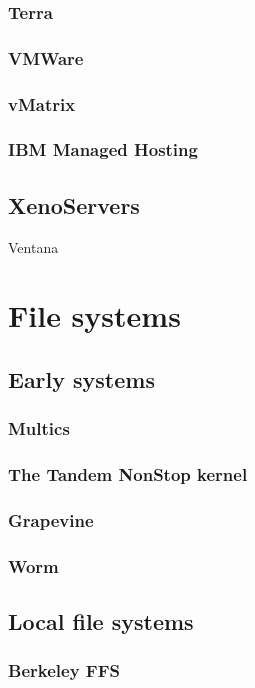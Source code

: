 \subsubsection{Terra}
\cite{garfinkel}
\subsubsection{VMWare}
\subsubsection{vMatrix}
\subsubsection{IBM Managed Hosting}

\subsection{XenoServers}
\cite{kotsovinos}

Ventana \cite{pfaff}

\section{File systems}

\subsection{Early systems}
\subsubsection{Multics}
\cite{corbato}
\subsubsection{The Tandem NonStop kernel}
\cite{bartlett}
\subsubsection{Grapevine}
\cite{birrell82}
\subsubsection{Worm}
\cite{shoch}

\subsection{Local file systems}
\subsubsection{Berkeley FFS}
